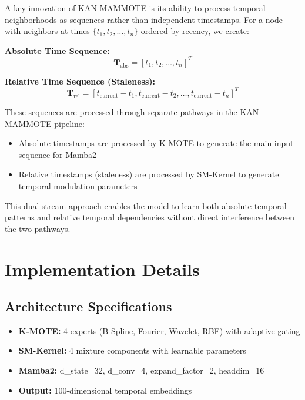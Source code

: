\documentclass[conference]{IEEEtran}
\begin{document}
A key innovation of KAN-MAMMOTE is its ability to process temporal neighborhoods as sequences rather than independent timestamps. For a node with neighbors at times $\{t_1, t_2, \ldots, t_n\}$ ordered by recency, we create:

\textbf{Absolute Time Sequence:}
\begin{equation}
\mathbf{T}_{\text{abs}} = [t_1, t_2, \ldots, t_n]^T
\end{equation}

\textbf{Relative Time Sequence (Staleness):}
\begin{equation}
\mathbf{T}_{\text{rel}} = [t_{\text{current}} - t_1, t_{\text{current}} - t_2, \ldots, t_{\text{current}} - t_n]^T
\end{equation}

These sequences are processed through separate pathways in the KAN-MAMMOTE pipeline:
\begin{itemize}
\item Absolute timestamps are processed by K-MOTE to generate the main input sequence for Mamba2
\item Relative timestamps (staleness) are processed by SM-Kernel to generate temporal modulation parameters
\end{itemize}

This dual-stream approach enables the model to learn both absolute temporal patterns and relative temporal dependencies without direct interference between the two pathways.

\section{Implementation Details}

\subsection{Architecture Specifications}

\begin{itemize}
\item \textbf{K-MOTE:} 4 experts (B-Spline, Fourier, Wavelet, RBF) with adaptive gating
\item \textbf{SM-Kernel:} 4 mixture components with learnable parameters
\item \textbf{Mamba2:} d\_state=32, d\_conv=4, expand\_factor=2, headdim=16
\item \textbf{Output:} 100-dimensional temporal embeddings
\end{itemize}
\end{document}

